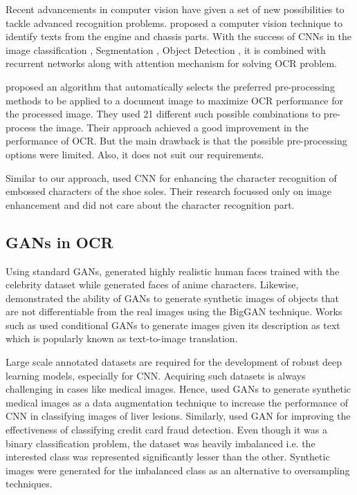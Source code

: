 	Recent advancements in computer vision have given a set of new possibilities to tackle advanced recognition problems. \cite{patil2015engraved} proposed a computer vision technique to identify texts from the engine and chassis parts.  With the success of CNNs in the image classification \citep{hinton2012improving,simonyan2014very}, Segmentation \citep{girshick2014rich}, Object Detection \citep{russakovsky2015imagenet}, it is combined with recurrent networks along with attention mechanism for solving OCR problem. 
\newline

	\cite{bui2017selecting} proposed an algorithm that automatically selects the preferred pre-processing methods to be applied to a document image to maximize OCR performance for the processed image. They used 21 different such possible combinations to pre-process the image. Their approach achieved a good improvement in the performance of OCR. But the main drawback is that the possible pre-processing options were limited. Also, it does not suit our requirements.  
\newline

	Similar to our approach, \cite{hu2019embossed} used CNN for enhancing the character recognition of embossed characters of the shoe soles. Their research focussed only on image enhancement and did not care about the character recognition part.
	
\subsection{GANs in OCR}
	 Using standard GANs, \cite{karras2017progressive} generated highly realistic human faces trained with the celebrity dataset while \cite{jin2017towards} generated faces of anime characters. Likewise, \cite{brock2018large} demonstrated the ability of GANs to generate synthetic images of objects that are not differentiable from the real images using the BigGAN technique. Works such as \citep{zhang2017stackgan,reed2016learning,reed2016generative,dash2017tac} used conditional GANs to generate images given its description as text which is popularly known as text-to-image translation.
\newline

	Large scale annotated datasets are required for the development of robust deep learning models, especially for CNN. Acquiring such datasets is always challenging in cases like medical images. Hence, \cite{frid2018gan} used GANs to generate synthetic medical images as a data augmentation technique to increase the performance of CNN in classifying images of liver lesions. Similarly, \cite{fiore2019using} used GAN for improving the effectiveness of classifying credit card fraud detection. Even though it was a binary classification problem, the dataset was heavily imbalanced i.e. the interested class was represented significantly lesser than the other. Synthetic images were generated for the imbalanced class as an alternative to oversampling techniques.
\newline
	
